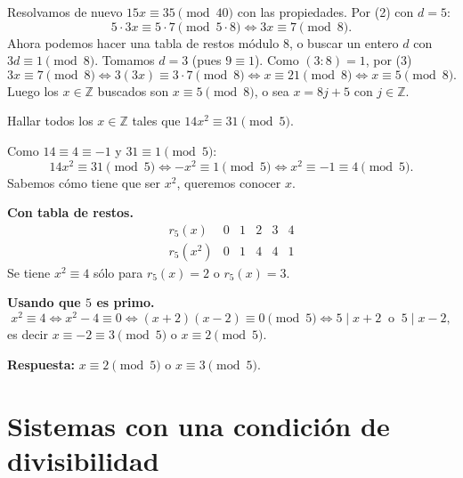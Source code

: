 \begin{ejemplo}
Resolvamos de nuevo $15x\equiv 35 \pmod{40}$ con las propiedades.
Por (2) con $d=5$:
\[
5\cdot 3x\equiv 5\cdot 7 \pmod{5\cdot 8} \iff 3x\equiv 7 \pmod 8.
\]
Ahora podemos hacer una tabla de restos módulo $8$, o buscar un entero $d$ con
$3d\equiv 1 \pmod 8$. Tomamos $d=3$ (pues $9\equiv 1$). Como $(3:8)=1$, por (3)
\[
3x\equiv 7 \pmod 8 \iff 3(3x)\equiv 3\cdot 7 \pmod 8 \iff x\equiv 21 \pmod 8 \iff x\equiv 5 \pmod 8.
\]
Luego los $x\in\mathbb{Z}$ buscados son $x\equiv 5 \pmod 8$, o sea $x=8j+5$ con
$j\in\mathbb{Z}$.
\end{ejemplo}

\begin{ejemplo}
Hallar todos los $x\in\mathbb{Z}$ tales que $14x^2\equiv 31 \pmod 5$.

Como $14\equiv 4\equiv -1$ y $31\equiv 1 \pmod 5$:
\[
14x^2\equiv 31 \pmod 5 \iff -x^2\equiv 1 \pmod 5 \iff x^2\equiv -1\equiv 4 \pmod 5.
\]
Sabemos cómo tiene que ser $x^2$, queremos conocer $x$.

\textbf{Con tabla de restos.}
\[
\begin{array}{c|ccccc}
r_5(x) & 0 & 1 & 2 & 3 & 4 \\ \hline
r_5(x^2) & 0 & 1 & 4 & 4 & 1
\end{array}
\]
Se tiene $x^2\equiv 4$ sólo para $r_5(x)=2$ o $r_5(x)=3$.

\textbf{Usando que $5$ es primo.}
\[
x^2\equiv 4 \iff x^2-4\equiv 0 \iff (x+2)(x-2)\equiv 0 \pmod 5
\iff 5\mid x+2 \ \text{ o } \ 5\mid x-2,
\]
es decir $x\equiv -2\equiv 3 \pmod 5$ o $x\equiv 2 \pmod 5$.

\textbf{Respuesta:} $x\equiv 2 \pmod 5$ o $x\equiv 3 \pmod 5$.
\end{ejemplo}

\section{Sistemas con una condición de divisibilidad}

